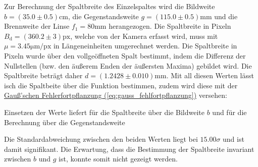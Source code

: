 Zur Berechnung der Spaltbreite des Einzelspaltes wird die Bildweite $b=(35.0 \pm 0.5) \mathrm{cm}$, die Gegenstandsweite $g = (115.0 \pm 0.5)\mathrm{mm}$ und die Brennweite der Linse $f_1 = 80 \mathrm{mm}$ herangezogen. Die Spaltbreite in Pixeln $B_\text{d} = (360.2 \pm 3) \mathrm{px}$, welche von der Kamera erfasst wird, muss mit $\mu = 3.45 \mathrm{\mu m/px}$ in Längeneinheiten umgerechnet werden. Die Spaltbreite in Pixeln wurde über den vollgeöffneten Spalt bestimmt, indem die Differenz der Nullstellen (bzw. den äußerem Enden der äußersten Maxima) gebildet wird.
Die Spaltbreite beträgt daher $d = (1.2428 \pm 0.010) \mathrm{m m}$. Mit all diesen Werten lässt isch die Spaltbeite über die Funktion
bestimmen, zudem wird diese mit der \hyperref[eq:gauss_fehlfortpflanzung]{Gauß'schen Fehlerfortpflanzung (\ref*{eq:gauss_fehlfortpflanzung})} versehen:

Einsetzen der Werte liefert für die Spaltbreite über die Bildweite $b$ 
\label{eq:resssss1}
und für die Berechnung über die Gegenstandsweite
\label{eq:resssss2}

Die Standardabweichung zwischen den beiden Werten liegt bei $15.00\sigma$ und ist damit signifikant. Die Erwartung, dass die Bestimmung der Spaltbreite invariant zwischen $b$ und $g$ ist, konnte somit nicht gezeigt werden.


